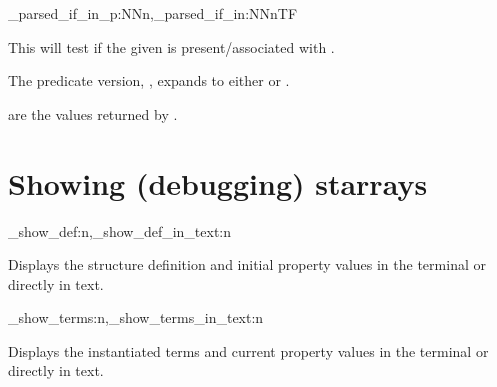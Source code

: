 \documentclass[10pt]{article}
\begin{document}
\begin{codedescribe}[code,EXP,new=2023/11/28]{\starray_parsed_if_in_p:NNn,\starray_parsed_if_in:NNnTF}
\begin{codesyntax}%
\end{codesyntax}
This will test if the given  is present/associated with .
\end{codedescribe}
\begin{tsremark}
The predicate version, , expands to either  or .
\end{tsremark}
\begin{tsremark}
 are the values returned by .
\end{tsremark}


\section{Showing (debugging) starrays }\label{pack:show}

\begin{codedescribe}{\starray_show_def:n,\starray_show_def_in_text:n}
\begin{codesyntax}%
\end{codesyntax}
\end{codedescribe}
Displays the  structure definition and initial property values in the terminal or directly in text.


\begin{codedescribe}{\starray_show_terms:n,\starray_show_terms_in_text:n}
\begin{codesyntax}%
\end{codesyntax}
\end{codedescribe}
Displays the  instantiated terms and current  property values in the terminal or directly in text.
\end{document}

